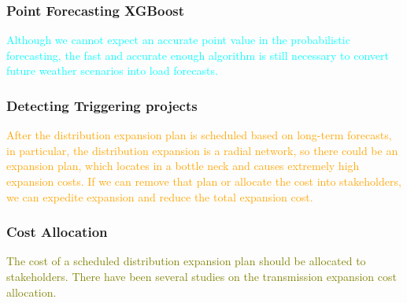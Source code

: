 \documentclass[journal]{IEEEtran} %
\begin{document}
\subsubsection{Point Forecasting XGBoost}
\textcolor{cyan}{Although we cannot expect an accurate point value in the probabilistic forecasting, the fast and accurate enough algorithm is still necessary to convert future weather scenarios into load forecasts.}



\vspace{1.3in}

































\subsubsection{Detecting Triggering projects}
\textcolor{orange}{After the distribution expansion plan is scheduled based on long-term forecasts, in particular, the distribution expansion is a radial network, so there could be an expansion plan, which locates in a bottle neck and causes extremely high expansion costs. If we can remove that plan or allocate the cost into stakeholders, we can expedite expansion and reduce the total expansion cost. }





\vspace{1in}







\subsubsection{Cost Allocation}
\textcolor{olive}{The cost of a scheduled distribution expansion plan should be allocated to stakeholders. There have been several studies on the transmission expansion cost allocation.}
\end{document}
